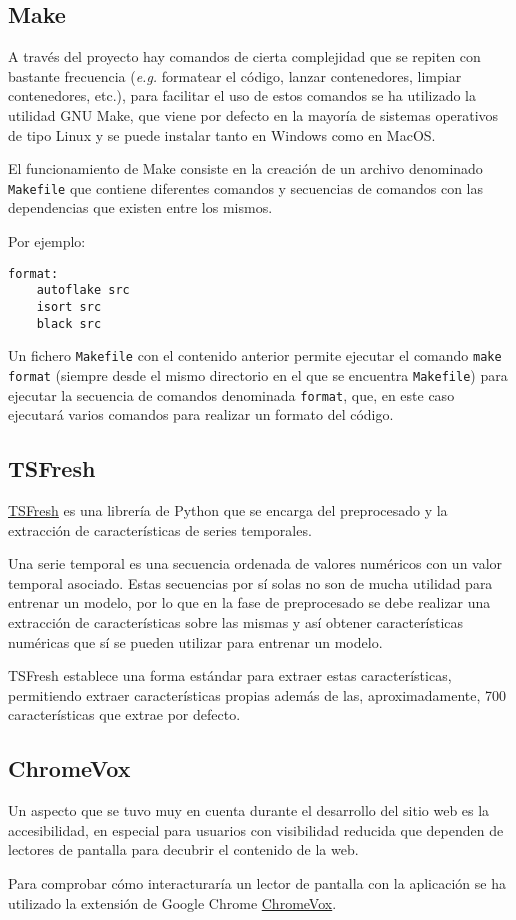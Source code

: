 \subsection{Make}

A través del proyecto hay comandos de cierta complejidad que se repiten con
bastante frecuencia (\textit{e.g.} formatear el código, lanzar contenedores,
limpiar contenedores, etc.), para facilitar el uso de estos comandos se ha
utilizado la utilidad GNU Make, que viene por defecto en la mayoría de sistemas
operativos de tipo Linux y se puede instalar tanto en Windows como en MacOS.

El funcionamiento de Make consiste en la creación de un archivo denominado
\texttt{Makefile} que contiene diferentes comandos y secuencias de comandos con
las dependencias que existen entre los mismos.

Por ejemplo:

\begin{verbatim}
format:
    autoflake src
    isort src
    black src
\end{verbatim}

Un fichero \texttt{Makefile} con el contenido anterior permite ejecutar el
comando \texttt{make format} (siempre desde el mismo directorio en el que se
encuentra \texttt{Makefile}) para ejecutar la secuencia de comandos denominada
\texttt{format}, que, en este caso ejecutará varios comandos para realizar un
formato del código.

\subsection{TSFresh}

\href{https://github.com/blue-yonder/tsfresh}{TSFresh}\cite{christ2018time} es
una librería de Python que se encarga del preprocesado y la extracción de
características de series temporales.

Una serie temporal es una secuencia ordenada de valores numéricos con un valor
temporal asociado. Estas secuencias por sí solas no son de mucha utilidad para
entrenar un modelo, por lo que en la fase de preprocesado se debe realizar una
extracción de características sobre las mismas y así obtener características
numéricas que sí se pueden utilizar para entrenar un modelo.

TSFresh establece una forma estándar para extraer estas características,
permitiendo extraer características propias además de las, aproximadamente, 700
características que extrae por defecto.

\subsection{ChromeVox}

Un aspecto que se tuvo muy en cuenta durante el desarrollo del sitio web es la
accesibilidad, en especial para usuarios con visibilidad reducida que dependen
de lectores de pantalla para decubrir el contenido de la web.

Para comprobar cómo interacturaría un lector de pantalla con la aplicación se ha
utilizado la extensión de Google Chrome
\href{https://chrome.google.com/webstore/detail/screen-reader/kgejglhpjiefppelpmljglcjbhoiplfn}{ChromeVox}.
